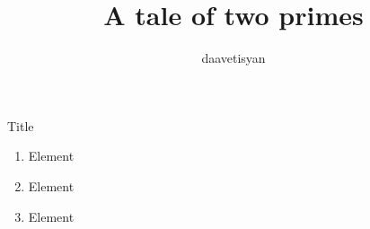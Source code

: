 \documentclass{beamer}
\author{daavetisyan}
\title{A tale of two primes}
\begin{document}
\begin{frame}{Title}
\begin{enumerate}
\item Element
\pause
\item Element
\pause
\item Element
\end{enumerate}
\end{frame}
\end{document}
